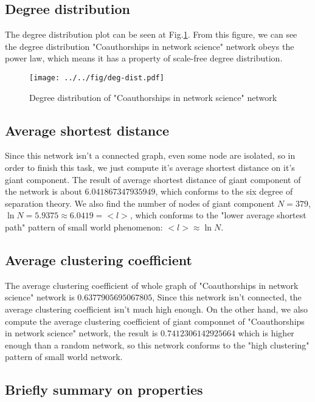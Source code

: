 \documentclass[runningheads]{llncs}
\begin{document}
\subsection{Degree distribution}

The degree distribution plot can be seen at Fig.\ref{fig:deg-dist}.
From this figure, we can see the degree distribution "Coauthorships in network science" network obeys
the power law, which means it has a property of scale-free degree distribution.

\begin{figure}
    \centering
    \texttt{[image: ../../fig/deg-dist.pdf]}
    \caption{Degree distribution of "Coauthorships in network science" network} 
    \label{fig:deg-dist}
\end{figure}

\subsection{Average shortest distance}

Since this network isn't a connected graph, even some node are isolated,
so in order to finish this task, we just compute it's average shortest distance on it's giant component.
The result of average shortest distance of giant component of the network is about $6.041867347935949$,
which conforms to the six degree of separation theory. 
We also find the number of nodes of giant component $N=379$, $\ln{N}=5.9375\approx6.0419=<l>$, 
which conforms to the "lower average shortest path" pattern of small world phenomenon: $<l>\approx\ln{N}$.

\subsection{Average clustering coefficient}

The average clustering coefficient of whole graph of "Coauthorships in network science" network is $0.6377905695067805$, 
Since this network isn't connected, the average clustering coefficient isn't much high enough. 
On the other hand, we also compute the average clustering coefficient of giant componnet of "Coauthorships in network science" network, the result is $0.7412306142925664$
which is higher enough than a random network, so this network conforms to the "high clustering" pattern of small world network.

\subsection{Briefly summary on properties}
\end{document}
